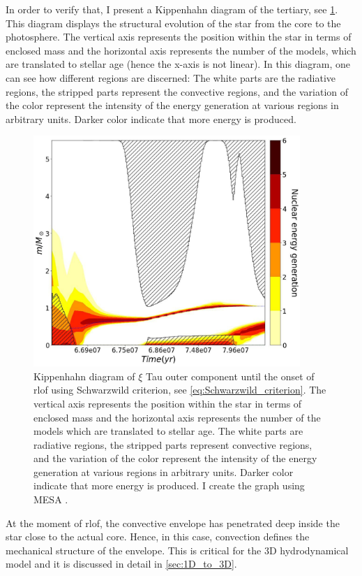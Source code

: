 In order to verify that, I present a Kippenhahn diagram of the tertiary, see \cref{fig:kippen_plot}. This diagram displays the structural evolution of the star from the core to the photosphere. The vertical axis represents the position within the star in terms of enclosed mass and the horizontal axis represents the number of the models, which are translated to stellar age (hence the x-axis is not linear). In this diagram, one can see how different regions are discerned: The white parts are the radiative regions, the stripped parts represent the convective regions, and the variation of the color represent the intensity of the energy generation at various regions in arbitrary units. Darker color indicate that more energy is produced.
\begin{figure}[H]
    \centering
    \includegraphics[width=0.9\textwidth]{Thesis/graphs/Kippen_ROLF_Schw.pdf}
    \caption{Kippenhahn diagram of $\xi$ Tau outer component until the onset of \ac{rlof} using Schwarzwild criterion, see \cref{eq:Schwarzwild_criterion}. The vertical axis represents the position within the star in terms of enclosed mass and the horizontal axis represents the number of the models which are translated to stellar age. The white parts are radiative regions, the stripped parts represent convective regions, and the variation of the color represent the intensity of the energy generation at various regions in arbitrary units. Darker color indicate that more energy is produced. I create the graph using MESA \citep{paxton2010modules,paxton2013modules,paxton2015modules,paxton2019modules}.}
    \label{fig:kippen_plot}
\end{figure}
At the moment of \ac{rlof}, the convective envelope has penetrated deep inside the star close to the actual core. Hence, in this case, convection defines the mechanical structure of the envelope. This is critical for the 3D hydrodynamical model and it is discussed in detail in \cref{sec:1D_to_3D}. 


